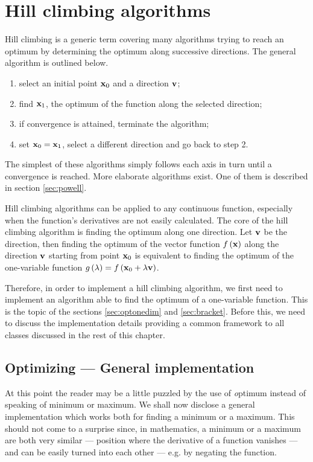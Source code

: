 \section{Hill climbing algorithms}
Hill climbing is a generic term covering many algorithms trying to
reach an optimum by determining the optimum along successive
directions. The general algorithm is outlined below.
\begin{enumerate}
  \item select an initial point ${\textbf x}_0$ and a direction ${\textbf v}$;
  \item find ${\textbf x}_1$, the optimum of the function along the selected
  direction;
  \item if convergence is attained, terminate the algorithm;
  \item set ${\textbf x}_0={\textbf x}_1$, select a different direction and go back to step 2.
\end{enumerate}
The simplest of these algorithms simply follows each axis in turn
until a convergence is reached. More elaborate algorithms
exist\cite{Press}. One of them is described in section
\ref{sec:powell}.

Hill climbing algorithms can be applied to any continuous
function, especially when the function's derivatives are not
easily calculated. The core of the hill climbing algorithm is
finding the optimum along one direction. Let ${\textbf v}$ be the
direction, then finding the optimum of the vector function
$f\left({\textbf x}\right)$ along the direction ${\textbf v}$ starting
from point ${\textbf x}_0$ is equivalent to finding the optimum of the
one-variable function $g\left(\lambda\right)=f\left({\textbf
x}_0+\lambda{\textbf v}\right)$.

Therefore, in order to implement a hill climbing algorithm, we
first need to implement an algorithm able to find the optimum of a
one-variable function. This is the topic of the sections
\ref{sec:optonedim} and \ref{sec:bracket}. Before this, we need to
discuss the implementation details providing a common framework to
all classes discussed in the rest of this chapter.

\subsection{Optimizing --- General implementation}
\label{sec:goptonedim} At this point the reader may be a little
puzzled by the use of {\textsl optimum} instead of speaking of minimum
or maximum. We shall now disclose a general implementation which
works both for finding a minimum or a maximum. This should not
come to a surprise since, in mathematics, a minimum or a maximum
are both very similar --- position where the derivative of a
function vanishes
--- and can be easily turned into each other --- e.g. by negating the
function.

